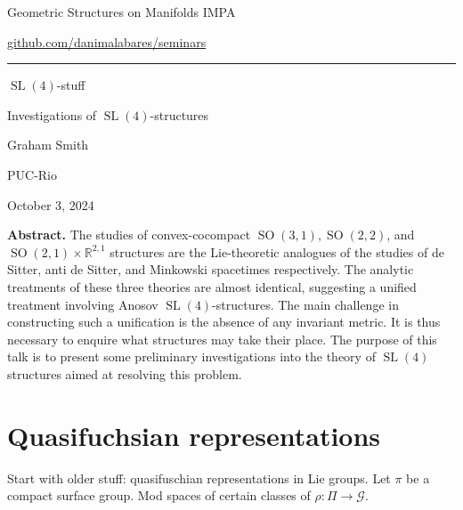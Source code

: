 



\begin{minipage}{\textwidth}
	\begin{minipage}{1\textwidth}
		Geometric Structures on Manifolds \hfill IMPA
		
		{\small\hfill\href{https://github.com/danimalabares/seminars}{github.com/danimalabares/seminars}}

		
	\end{minipage}
\end{minipage}\vspace{.2cm}\hrule

\vspace{10pt}

{\Huge  $\operatorname{SL}(4)$-stuff}

{\Large Investigations of $\operatorname{SL}(4)$-structures}


\hfill{\Large Graham Smith}

{\Large \hfill PUC-Rio}

\hfill{\large October 3, 2024}

\vspace{1em}
{\color{6}\bfseries Abstract.}\hspace{.5em} The studies of convex-cocompact $\operatorname{SO}(3,1),\operatorname{SO}(2,2)$,
 and $\operatorname{SO}(2,1)\times \mathbb{R}^{2,1}$ structures are the Lie-theoretic analogues of the studies of de Sitter, anti de Sitter, and Minkowski spacetimes respectively. The analytic treatments of these three theories are almost identical, suggesting a unified treatment involving Anosov $\operatorname{SL}(4)$-structures. The main challenge in constructing such a unification is the absence of any invariant metric. It is thus necessary to enquire what structures may take their place. The purpose of this talk is to present some preliminary investigations into the theory of $\operatorname{SL}(4)$ structures aimed at resolving this problem.
\tableofcontents

\section{Quasifuchsian representations}

Start with older stuff: quasifuschian representations in Lie groups. Let $\pi$ be a compact surface group. Mod spaces of certain classes of $\rho:\Pi\longrightarrow \mathcal{G}$.

